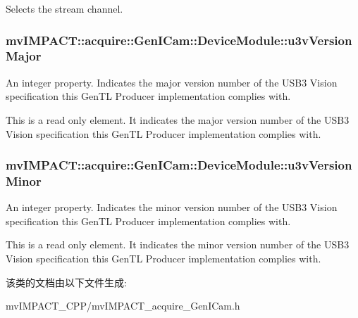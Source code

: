Selects the stream channel. \hypertarget{classmv_i_m_p_a_c_t_1_1acquire_1_1_gen_i_cam_1_1_device_module_adc21a4ebdc3dc22a2c86be4b735aedff}{
\subsubsection[{u3v\+Version\+Major}]{ mv\+I\+M\+P\+A\+C\+T\+::acquire\+::\+Gen\+I\+Cam\+::\+Device\+Module\+::u3v\+Version\+Major}}\label{classmv_i_m_p_a_c_t_1_1acquire_1_1_gen_i_cam_1_1_device_module_adc21a4ebdc3dc22a2c86be4b735aedff}


An integer property. Indicates the major version number of the U\+S\+B3 Vision specification this Gen\+T\+L Producer implementation complies with. 

This is a read only element. It indicates the major version number of the U\+S\+B3 Vision specification this Gen\+T\+L Producer implementation complies with. \hypertarget{classmv_i_m_p_a_c_t_1_1acquire_1_1_gen_i_cam_1_1_device_module_a30f7b5107030f1ec826e3f570cb7a329}{
\subsubsection[{u3v\+Version\+Minor}]{ mv\+I\+M\+P\+A\+C\+T\+::acquire\+::\+Gen\+I\+Cam\+::\+Device\+Module\+::u3v\+Version\+Minor}}\label{classmv_i_m_p_a_c_t_1_1acquire_1_1_gen_i_cam_1_1_device_module_a30f7b5107030f1ec826e3f570cb7a329}


An integer property. Indicates the minor version number of the U\+S\+B3 Vision specification this Gen\+T\+L Producer implementation complies with. 

This is a read only element. It indicates the minor version number of the U\+S\+B3 Vision specification this Gen\+T\+L Producer implementation complies with. 

该类的文档由以下文件生成\+:\begin{DoxyCompactItemize}
\item 
mv\+I\+M\+P\+A\+C\+T\+\_\+\+C\+P\+P/mv\+I\+M\+P\+A\+C\+T\+\_\+acquire\+\_\+\+Gen\+I\+Cam.\+h\end{DoxyCompactItemize}
